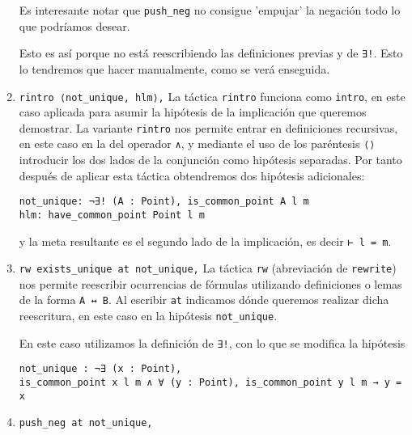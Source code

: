 \begin{enumerate}[label=L.\arabic*, topsep=0mm]

	      Es interesante notar que \lstinline{push_neg} no consigue 'empujar' la negación todo lo que podríamos desear.

	      Esto es así porque no está reescribiendo las definiciones previas y de
	      \lstinline{∃!}. Esto lo tendremos que hacer manualmente, como se verá
	      enseguida.

	\item \lstinline{rintro ⟨not_unique, hlm⟩,} La táctica \lstinline{rintro}
	      funciona como \lstinline{intro}, en este caso aplicada para asumir la
	      hipótesis de la implicación que queremos demostrar. La variante
	      \lstinline{rintro} nos permite entrar en definiciones recursivas, en este
	      caso en la del operador \lstinline{∧}, y mediante el uso de los paréntesis
	      \lstinline{⟨⟩} introducir los dos lados de la conjunción como hipótesis
	      separadas. Por tanto después de aplicar esta táctica obtendremos dos
	      hipótesis adicionales:
	      \begin{lstlisting}
not_unique: ¬∃! (A : Point), is_common_point A l m
hlm: have_common_point Point l m
\end{lstlisting}
	      y la meta resultante es el segundo lado de la implicación, es decir
	      \lstinline{⊢ l = m}.

	\item \lstinline{rw exists_unique at not_unique,}  La táctica \lstinline{rw}
	      (abreviación de \lstinline{rewrite}) nos permite reescribir ocurrencias de
	      fórmulas utilizando definiciones o lemas de la forma \lstinline{A ↔ B}. Al
	      escribir \lstinline{at} indicamos dónde queremos realizar dicha
	      reescritura, en este caso en la hipótesis \lstinline{not_unique}.

	      En este caso utilizamos la definición de \lstinline{∃!}, con lo que se modifica la hipótesis
	      \begin{lstlisting}
not_unique : ¬∃ (x : Point), 
is_common_point x l m ∧ ∀ (y : Point), is_common_point y l m → y = x
\end{lstlisting}

	\item \lstinline{push_neg at not_unique,}


\end{enumerate}
